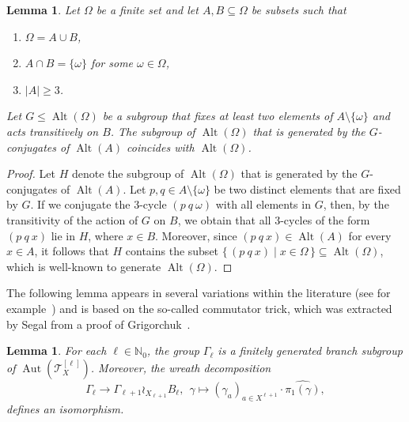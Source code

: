 \documentclass[a4paper]{amsart}
\renewcommand\leq\leqslant
\renewcommand\geq\geqslant
\numberwithin{equation}{section}
\newtheorem{lemma}[theorem]{Lemma}
\theoremstyle{definition}
\theoremstyle{remark}
\newcommand{\N}{\mathbb{N}}
\DeclareMathOperator{\Alt}{Alt}
\DeclareMathOperator{\Aut}{Aut}
\newcommand\Set[2]{\{\,#1\mid#2\,\}}
\newcommand{\T}{\mathcal{T}}
\begin{document}
\begin{lemma}\label{lem:alternating}
Let $\Omega$ be a finite set and let $A,B \subseteq \Omega$ be subsets such that
\begin{enumerate}
\item $\Omega =  A \cup B$,
\item $A \cap B = \{\omega\}$ for some $\omega \in \Omega$,
\item $|A| \geq 3$.
\end{enumerate}
Let $G \leq \Alt(\Omega)$ be a subgroup that fixes at least two elements of $A \setminus \{\omega\}$ and acts transitively on $B$.
The subgroup of $\Alt(\Omega)$ that is generated by the $G$-conjugates of $\Alt(A)$ coincides with $\Alt(\Omega)$.
\end{lemma}

\begin{proof}
Let $H$ denote the subgroup of $\Alt(\Omega)$ that is generated by the $G$-conjugates of $\Alt(A)$.
Let $p,q \in A \setminus \{\omega\}$ be two distinct elements that are fixed by $G$.
If we conjugate the $3$-cycle $(p\ q\ \omega)$ with all elements in $G$, then, by the transitivity of the action of $G$ on $B$, we obtain that all $3$-cycles of the form $(p\ q\ x)$ lie in $H$, where $x \in B$.
Moreover, since $(p\ q\ x) \in \Alt(A)$ for every $x \in A$, it follows that $H$ contains the subset $\Set{(p\ q\ x)}{x \in \Omega} \subseteq \Alt(\Omega)$, which is well-known to generate $\Alt(\Omega)$.
\end{proof}

The following lemma appears in several variations within the literature (see for example~\cite{Segal01,KionkeSchesler21}) and is based on the so-called commutator trick, which was extracted by Segal \cite[Lemma 4]{Segal01} from a proof of Grigorchuk~\cite[Theorem 4]{Grigorchuk00}.

\begin{lemma}\label{lem:branch-group-arg}
For each $\ell \in \N_0$, the group $\Gamma_{\ell}$ is a finitely generated branch subgroup of $\Aut(\T_X^{[\ell]})$.
Moreover, the wreath decomposition
\[
  \Gamma_{\ell} \rightarrow \Gamma_{\ell+1} \wr_{X_{\ell+1}} B_{\ell},
  \ \ 
  \gamma \mapsto (\gamma_a)_{a \in X^{\ell+1}} \cdot \widehat{\pi_{1}(\gamma)},
\]
defines an isomorphism.
\end{lemma}
\end{document}
